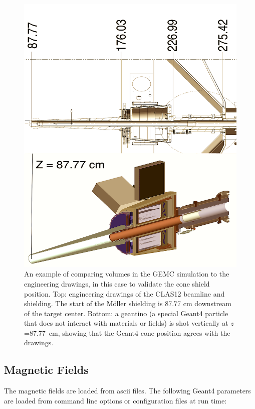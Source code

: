 \begin{figure}
	\centering
	\includegraphics[width=0.99\columnwidth,keepaspectratio]{img/cadValidationExample.png}
	\caption{An example of comparing volumes in the GEMC simulation to the engineering drawings, in this case to validate the cone shield
             position. Top: engineering drawings of the CLAS12 beamline and shielding. The start of the M\"oller shielding is 87.77 cm downstream
             of the target center. Bottom: a geantino (a special Geant4 particle that does not interact with materials or fields)
             is shot vertically at $z$=87.77~cm, showing that the Geant4 cone position agrees with the drawings.}
	\label{fig:cadValidationExample}
\end{figure}



\subsection{Magnetic Fields}
The magnetic fields are loaded from ascii files. The following Geant4 parameters are loaded from
command line options or configuration files at run time:

